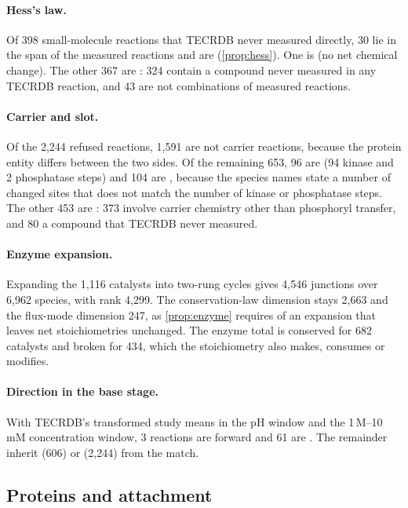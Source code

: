\paragraph{Hess's law.}
Of 398 small-molecule reactions that TECRDB never measured directly, 30 lie in the span of the measured reactions and are  (\cref{prop:hess}).
One is  (no net chemical change).
The other 367 are : 324 contain a compound never measured in any TECRDB reaction, and 43 are not combinations of measured reactions.

\paragraph{Carrier and slot.}
Of the 2{,}244 refused reactions, 1{,}591 are not carrier reactions, because the protein entity differs between the two sides.
Of the remaining 653, 96 are  (94 kinase and 2 phosphatase steps) and 104 are , because the species names state a number of changed sites that does not match the number of kinase or phosphatase steps.
The other 453 are : 373 involve carrier chemistry other than phosphoryl transfer, and 80 a compound that TECRDB never measured.

\paragraph{Enzyme expansion.}
Expanding the 1{,}116 catalysts into two-rung cycles gives 4{,}546 junctions over 6{,}962 species, with rank 4{,}299.
The conservation-law dimension stays 2{,}663 and the flux-mode dimension 247, as \cref{prop:enzyme} requires of an expansion that leaves net stoichiometries unchanged.
The enzyme total is conserved for 682 catalysts and broken for 434, which the stoichiometry also makes, consumes or modifies.

\paragraph{Direction in the base stage.}
With TECRDB's transformed study means in the pH window and the 1\,\textmu M--10\,mM concentration window, 3 reactions are  forward and 61 are .
The remainder inherit  (606) or  (2{,}244) from the match.

\subsection{Proteins and attachment}
\label{sec:res-proteins}

